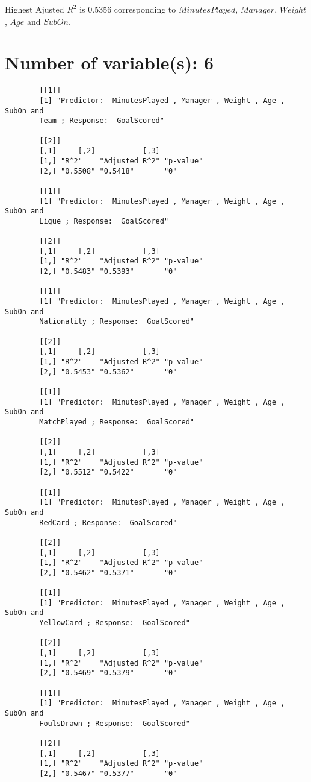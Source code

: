 \documentclass[12pt]{article}
\begin{document}
		Highest Ajusted $ R^2 $ is 0.5356 corresponding to $ MinutesPlayed $, $ Manager $, $ Weight $, $ Age $ and $ SubOn $.
	
	\section{Number of variable(s): 6}
	
	\begin{verbatim}
		[[1]]
		[1] "Predictor:  MinutesPlayed , Manager , Weight , Age , SubOn and 
		Team ; Response:  GoalScored"
		
		[[2]]
		[,1]     [,2]           [,3]     
		[1,] "R^2"    "Adjusted R^2" "p-value"
		[2,] "0.5508" "0.5418"       "0"      
		
		[[1]]
		[1] "Predictor:  MinutesPlayed , Manager , Weight , Age , SubOn and 
		Ligue ; Response:  GoalScored"
		
		[[2]]
		[,1]     [,2]           [,3]     
		[1,] "R^2"    "Adjusted R^2" "p-value"
		[2,] "0.5483" "0.5393"       "0"      
		
		[[1]]
		[1] "Predictor:  MinutesPlayed , Manager , Weight , Age , SubOn and 
		Nationality ; Response:  GoalScored"
		
		[[2]]
		[,1]     [,2]           [,3]     
		[1,] "R^2"    "Adjusted R^2" "p-value"
		[2,] "0.5453" "0.5362"       "0"      
		
		[[1]]
		[1] "Predictor:  MinutesPlayed , Manager , Weight , Age , SubOn and 
		MatchPlayed ; Response:  GoalScored"
		
		[[2]]
		[,1]     [,2]           [,3]     
		[1,] "R^2"    "Adjusted R^2" "p-value"
		[2,] "0.5512" "0.5422"       "0"      
		
		[[1]]
		[1] "Predictor:  MinutesPlayed , Manager , Weight , Age , SubOn and 
		RedCard ; Response:  GoalScored"
		
		[[2]]
		[,1]     [,2]           [,3]     
		[1,] "R^2"    "Adjusted R^2" "p-value"
		[2,] "0.5462" "0.5371"       "0"      
		
		[[1]]
		[1] "Predictor:  MinutesPlayed , Manager , Weight , Age , SubOn and 
		YellowCard ; Response:  GoalScored"
		
		[[2]]
		[,1]     [,2]           [,3]     
		[1,] "R^2"    "Adjusted R^2" "p-value"
		[2,] "0.5469" "0.5379"       "0"      
		
		[[1]]
		[1] "Predictor:  MinutesPlayed , Manager , Weight , Age , SubOn and 
		FoulsDrawn ; Response:  GoalScored"
		
		[[2]]
		[,1]     [,2]           [,3]     
		[1,] "R^2"    "Adjusted R^2" "p-value"
		[2,] "0.5467" "0.5377"       "0"      
		

\end{verbatim}
\end{document}
